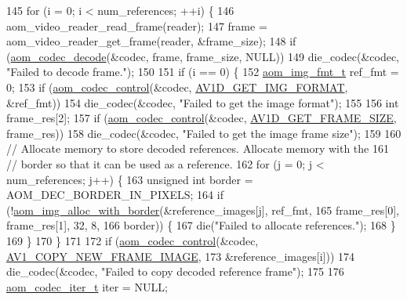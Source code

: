 \begin{DoxyCodeInclude}
{{{{145   \textcolor{keywordflow}{for} (i = 0; i < num\_references; ++i) \{
146     aom\_video\_reader\_read\_frame(reader);
147     frame = aom\_video\_reader\_get\_frame(reader, &frame\_size);
148     \textcolor{keywordflow}{if} (\hyperlink{group__decoder_gab03fdb999d1f83a5896869a3ba5f68f7}{aom\_codec\_decode}(&codec, frame, frame\_size, NULL))
149       die\_codec(&codec, \textcolor{stringliteral}{"Failed to decode frame."});
150 
151     \textcolor{keywordflow}{if} (i == 0) \{
152       \hyperlink{aom__image_8h_ab71efff8c7f49380fad23b93bc2e9bfc}{aom\_img\_fmt\_t} ref\_fmt = 0;
153       \textcolor{keywordflow}{if} (\hyperlink{group__codec_ga6da974f4eeaba1fa74106b28d0fe6ac5}{aom\_codec\_control}(&codec, \hyperlink{group__aom__decoder_gga3865fd4b3192489baa9a5c3632ebe97bacd7229e5fb766670fe995739931c2ee3}{AV1D\_GET\_IMG\_FORMAT}, &ref\_fmt))
154         die\_codec(&codec, \textcolor{stringliteral}{"Failed to get the image format"});
155 
156       \textcolor{keywordtype}{int} frame\_res[2];
157       \textcolor{keywordflow}{if} (\hyperlink{group__codec_ga6da974f4eeaba1fa74106b28d0fe6ac5}{aom\_codec\_control}(&codec, \hyperlink{group__aom__decoder_gga3865fd4b3192489baa9a5c3632ebe97ba175c454a7adf2d3927a0e979b4a2b07b}{AV1D\_GET\_FRAME\_SIZE}, frame\_res))
158         die\_codec(&codec, \textcolor{stringliteral}{"Failed to get the image frame size"});
159 
160       \textcolor{comment}{// Allocate memory to store decoded references. Allocate memory with the}
161       \textcolor{comment}{// border so that it can be used as a reference.}
162       \textcolor{keywordflow}{for} (j = 0; j < num\_references; j++) \{
163         \textcolor{keywordtype}{unsigned} \textcolor{keywordtype}{int} border = AOM\_DEC\_BORDER\_IN\_PIXELS;
164         \textcolor{keywordflow}{if} (!\hyperlink{aom__image_8h_aeb211e5184687f7e10d7c5bed4dcfdcd}{aom\_img\_alloc\_with\_border}(&reference\_images[j], ref\_fmt,
165                                        frame\_res[0], frame\_res[1], 32, 8,
166                                        border)) \{
167           die(\textcolor{stringliteral}{"Failed to allocate references."});
168         \}
169       \}
170     \}
171 
172     \textcolor{keywordflow}{if} (\hyperlink{group__codec_ga6da974f4eeaba1fa74106b28d0fe6ac5}{aom\_codec\_control}(&codec, \hyperlink{group__aom_gga9421a1fa78c0d9587ae5aa6c1cb3d659ae41763622ee33cd99e23ca8f78a3f8fa}{AV1\_COPY\_NEW\_FRAME\_IMAGE},
173                           &reference\_images[i]))
174       die\_codec(&codec, \textcolor{stringliteral}{"Failed to copy decoded reference frame"});
175 
176     \hyperlink{group__codec_gadf9e173c9e02788a9999399edab20a02}{aom\_codec\_iter\_t} iter = NULL;
}}}}
\end{DoxyCodeInclude}
